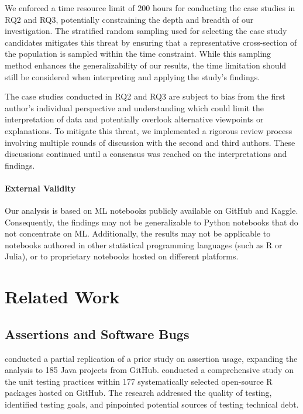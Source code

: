 \documentclass[smallextended]{svjour3}       %
\begin{document}
We enforced a time resource limit of 200 hours for conducting the case studies in RQ2 and RQ3, potentially constraining the depth and breadth of our investigation. The stratified random sampling used for selecting the case study candidates mitigates this threat by ensuring that a representative cross-section of the population is sampled within the time constraint. While this sampling method enhances the generalizability of our results, the time limitation should still be considered when interpreting and applying the study's findings.

The case studies conducted in RQ2 and RQ3 are subject to bias from the first author's individual perspective and understanding which could limit the interpretation of data and potentially overlook alternative viewpoints or explanations. To mitigate this threat, we implemented a rigorous review process involving multiple rounds of discussion with the second and third authors. These discussions continued until a consensus was reached on the interpretations and findings.

\paragraph{\textbf{External Validity}} Our analysis is based on ML notebooks publicly available on GitHub and Kaggle. Consequently, the findings may not be generalizable to Python notebooks that do not concentrate on ML. Additionally, the results may not be applicable to notebooks authored in other statistical programming languages (such as R or Julia), or to proprietary notebooks hosted on different platforms.

\section{Related Work}\label{sec:related}

\subsection{Assertions and Software Bugs}

\citet{kochhar2017revisiting} conducted a partial replication of a prior study on assertion usage, expanding the analysis to 185 Java projects from GitHub. \citet{vidoni2021evaluating} conducted a comprehensive study on the unit testing practices within 177 systematically selected open-source R packages hosted on GitHub. The research addressed the quality of testing, identified testing goals, and pinpointed potential sources of testing technical debt.
\end{document}
